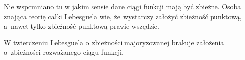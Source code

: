 \documentclass[a4paper,11pt]{article}
\begin{document}
\vspace{\spaceFour}





\noindent
{} Nie wspomniano tu w jakim sensie dane ciągi funkcji mają być
zbieżne. Osoba znająca teorię całki Lebesgue’a wie, że~wystarczy założyć
zbieżność punktową, a~nawet tylko zbieżność punktową prawie wszędzie.

\vspace{\spaceFour}





\noindent
{} W twierdzeniu Lebesgue’a o~zbieżności majoryzowanej
brakuje założenia o~zbieżności rozważanego ciągu funkcji.





\newpage

\end{document}
